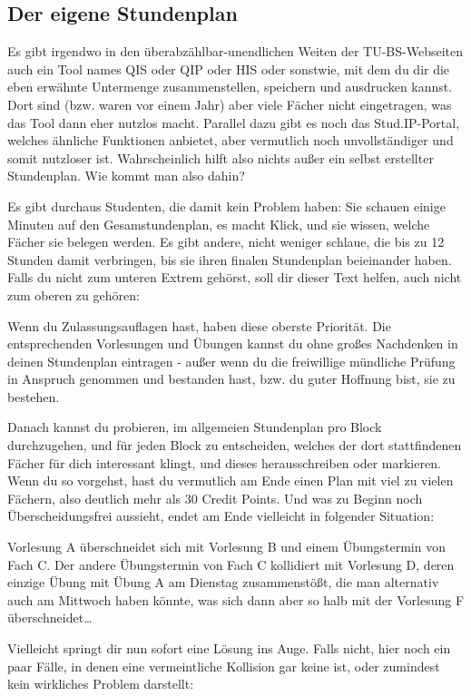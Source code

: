 \begin{multicols}{2}
\subsection{Der eigene Stundenplan}
Es gibt irgendwo in den überabzählbar-unendlichen Weiten der TU-BS-Webseiten auch ein Tool names QIS oder QIP oder HIS oder sonstwie, mit dem du dir die eben erwähnte Untermenge zusammenstellen, speichern und ausdrucken kannst. Dort sind (bzw. waren vor einem Jahr) aber viele Fächer nicht eingetragen, was das Tool dann eher nutzlos macht. Parallel dazu gibt es noch das Stud.IP-Portal, welches ähnliche Funktionen anbietet, aber vermutlich noch unvollständiger und somit nutzloser ist. Wahrscheinlich hilft also nichts außer ein selbst erstellter Stundenplan. Wie kommt man also dahin?

Es gibt durchaus Studenten, die damit kein Problem haben: Sie schauen einige Minuten auf den Gesamstundenplan, es macht Klick, und sie wissen, welche Fächer sie belegen werden. Es gibt andere, nicht weniger schlaue, die bis zu 12 Stunden damit verbringen, bis sie ihren finalen Stundenplan beieinander haben. Falls du nicht zum unteren Extrem gehörst, soll dir dieser Text helfen, auch nicht zum oberen zu gehören:

Wenn du Zulassungsauflagen hast, haben diese oberste Priorität. Die entsprechenden Vorlesungen und Übungen kannst du ohne großes Nachdenken in deinen Stundenplan eintragen - außer wenn du die freiwillige mündliche Prüfung in Anspruch genommen und bestanden hast, bzw. du guter Hoffnung bist, sie zu bestehen.

Danach kannst du probieren, im allgemeien Stundenplan pro Block durchzugehen, und für jeden Block zu entscheiden, welches der dort stattfindenen Fächer für dich interessant klingt, und dieses herausschreiben oder markieren. Wenn du so vorgehst, hast du vermutlich am Ende einen Plan mit viel zu vielen Fächern, also deutlich mehr als 30 Credit Points. Und was zu Beginn noch Überscheidungsfrei aussieht, endet am Ende vielleicht in folgender Situation:

Vorlesung A überschneidet sich mit Vorlesung B und einem Übungstermin von Fach C. Der andere Übungstermin von Fach C kollidiert mit Vorlesung D, deren einzige Übung mit Übung A am Dienstag zusammenstößt, die man alternativ auch am Mittwoch haben könnte, was sich dann aber so halb mit der Vorlesung F überschneidet\ldots

Vielleicht springt dir nun sofort eine Lösung ins Auge. Falls nicht, hier noch ein paar Fälle, in denen eine vermeintliche Kollision gar keine ist, oder zumindest kein wirkliches Problem darstellt:


\end{multicols}
